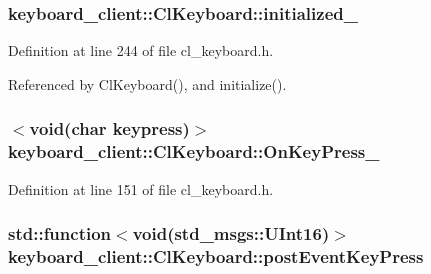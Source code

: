 \subsubsection[{\texorpdfstring{initialized\+\_\+}{initialized_}}]{ keyboard\+\_\+client\+::\+Cl\+Keyboard\+::initialized\+\_\+\hspace{0.3cm}{\ttfamily [private]}}\hypertarget{classkeyboard__client_1_1ClKeyboard_aff74d4f212f4846a1f7cc6c0e4d5f728}{}\label{classkeyboard__client_1_1ClKeyboard_aff74d4f212f4846a1f7cc6c0e4d5f728}


Definition at line 244 of file cl\+\_\+keyboard.\+h.



Referenced by Cl\+Keyboard(), and initialize().

\subsubsection[{\texorpdfstring{On\+Key\+Press\+\_\+}{OnKeyPress_}}]{$<$void(char keypress)$>$ keyboard\+\_\+client\+::\+Cl\+Keyboard\+::\+On\+Key\+Press\+\_\+}\hypertarget{classkeyboard__client_1_1ClKeyboard_a0fcb5b4432b26b8c8ca6924e8e82fbeb}{}\label{classkeyboard__client_1_1ClKeyboard_a0fcb5b4432b26b8c8ca6924e8e82fbeb}


Definition at line 151 of file cl\+\_\+keyboard.\+h.

\subsubsection[{\texorpdfstring{post\+Event\+Key\+Press}{postEventKeyPress}}]{\setlength{\rightskip}{0pt plus 5cm}std\+::function$<$void(std\+\_\+msgs\+::\+U\+Int16)$>$ keyboard\+\_\+client\+::\+Cl\+Keyboard\+::post\+Event\+Key\+Press}\hypertarget{classkeyboard__client_1_1ClKeyboard_aadd675eea47a012b348a4e6c00e7e9d0}{}\label{classkeyboard__client_1_1ClKeyboard_aadd675eea47a012b348a4e6c00e7e9d0}


